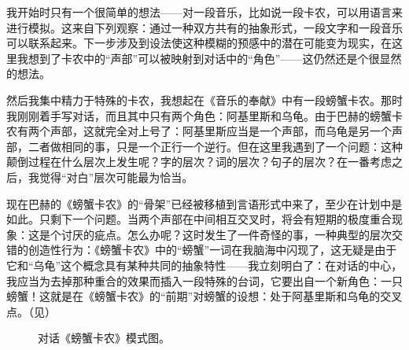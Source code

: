 \begin{description}[wide,format=\em\itemcolon,labelsep=\ccwd]
\item[前期]我开始时只有一个很简单的想法——对一段音乐，比如说一段卡农，可以用语言来进行模拟。这来自下列观察：通过一种双方共有的抽象形式，一段文字和一段音乐可以联系起来。下一步涉及到设法使这种模糊的预感中的潜在可能变为现实，在这里我想到了卡农中的“声部”可以被映射到对话中的“角色”——这仍然还是个很显然的想法。

然后我集中精力于特殊的卡农，我想起在《音乐的奉献》中有一段螃蟹卡农。那时我刚刚着手写对话，而且其中只有两个角色：阿基里斯和乌龟。由于巴赫的螃蟹卡农有两个声部，这就完全对上号了：阿基里斯应当是一个声部，而乌龟是另一个声部，二者做相同的事，只是一个正行一个逆行。但在这里我遇到了一个问题：这种颠倒过程在什么层次上发生呢？字的层次？词的层次？句子的层次？在一番考虑之后，我觉得“对白”层次可能最为恰当。

现在巴赫的《螃蟹卡农》的“骨架”已经被移植到言语形式中来了，至少在计划中是如此。只剩下一个问题。当两个声部在中间相互交叉时，将会有短期的极度重合现象：这是个讨厌的疵点。怎么办呢？这时发生了一件奇怪的事，一种典型的层次交错的创造性行为：《螃蟹卡农》中的“螃蟹”一词在我脑海中闪现了，这无疑是由于它和“乌龟”这个概念具有某种共同的抽象特性——我立刻明白了：在对话的中心，我应当为去掉那种重合的效果而插入一段特殊的台词，它要出自一个新角色：一只螃蟹！这就是在《螃蟹卡农》的“前期”对螃蟹的设想：处于阿基里斯和乌龟的交叉点。（见）

\begin{figure}
\caption[对话《螃蟹卡农》的模式图。]
  {对话《螃蟹卡农》模式图。}
\end{figure}


\end{description}
